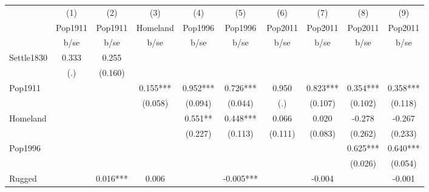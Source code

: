 {
\def\sym#1{\ifmmode^{#1}\else\(^{#1}\)\fi}
\begin{tabular}{l*{9}{c}}
\hline\hline
                    &\multicolumn{1}{c}{(1)}&\multicolumn{1}{c}{(2)}&\multicolumn{1}{c}{(3)}&\multicolumn{1}{c}{(4)}&\multicolumn{1}{c}{(5)}&\multicolumn{1}{c}{(6)}&\multicolumn{1}{c}{(7)}&\multicolumn{1}{c}{(8)}&\multicolumn{1}{c}{(9)}\\
                    &\multicolumn{1}{c}{Pop1911}&\multicolumn{1}{c}{Pop1911}&\multicolumn{1}{c}{Homeland}&\multicolumn{1}{c}{Pop1996}&\multicolumn{1}{c}{Pop1996}&\multicolumn{1}{c}{Pop2011}&\multicolumn{1}{c}{Pop2011}&\multicolumn{1}{c}{Pop2011}&\multicolumn{1}{c}{Pop2011}\\
                    &        b/se   &        b/se   &        b/se   &        b/se   &        b/se   &        b/se   &        b/se   &        b/se   &        b/se   \\
\hline
Settle1830          &       0.333   &       0.255   &               &               &               &               &               &               &               \\
                    &         (.)   &     (0.160)   &               &               &               &               &               &               &               \\
Pop1911             &               &               &       0.155***&       0.952***&       0.726***&       0.950   &       0.823***&       0.354***&       0.358***\\
                    &               &               &     (0.058)   &     (0.094)   &     (0.044)   &         (.)   &     (0.107)   &     (0.102)   &     (0.118)   \\
Homeland            &               &               &               &       0.551** &       0.448***&       0.066   &       0.020   &      -0.278   &      -0.267   \\
                    &               &               &               &     (0.227)   &     (0.113)   &     (0.111)   &     (0.083)   &     (0.262)   &     (0.233)   \\
Pop1996             &               &               &               &               &               &               &               &       0.625***&       0.640***\\
                    &               &               &               &               &               &               &               &     (0.026)   &     (0.054)   \\
Rugged              &               &       0.016***&       0.006   &               &      -0.005***&               &      -0.004   &               &      -0.001   \\

\end{tabular}}
